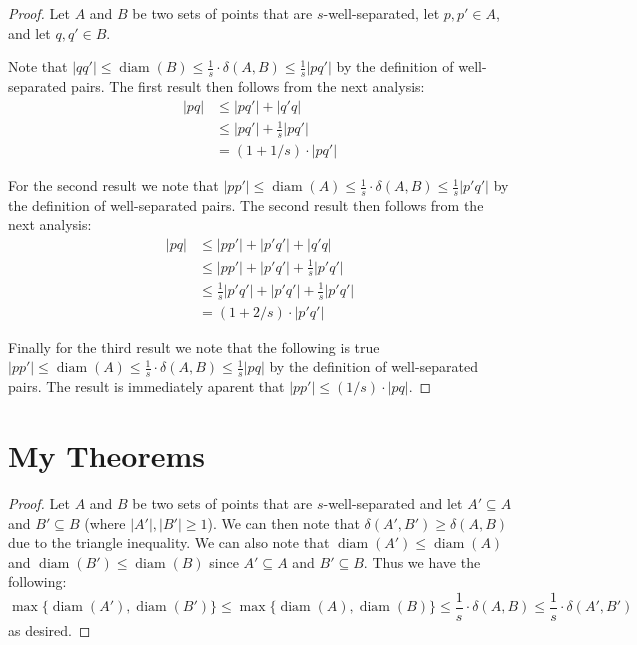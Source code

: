 \documentclass{article}
\newtheorem{lem}[thm]{Lemma}
\theoremstyle{definition}
\newcommand{\dist}{\delta}
\DeclareMathOperator{\diam}{diam}
\begin{document}
\begin{proof}
    Let $A$ and $B$ be two sets of points that are $s$-well-separated, let $p,p' \in A$, and let $q,q' \in B$.

    Note that $|qq'| \leq \diam(B) \leq \frac{1}{s} \cdot \dist(A,B) \leq \frac{1}{s} |pq'|$ by the definition of well-separated pairs.
    The first result then follows from the next analysis:
    \begin{align*}
        |pq| &\leq |pq'| + |q'q| \\
        &\leq |pq'| + \frac{1}{s} |pq'| \\
        &= (1 + 1/s) \cdot |pq'|
    \end{align*}

    For the second result we note that $|pp'| \leq \diam(A) \leq \frac{1}{s} \cdot \dist(A,B) \leq \frac{1}{s} |p'q'|$ by the definition of well-separated pairs.
    The second result then follows from the next analysis:
    \begin{align*}
        |pq| &\leq |pp'| + |p'q'| + |q'q| \\
        &\leq |pp'| + |p'q'| + \frac{1}{s} |p'q'| \\
        &\leq \frac{1}{s} |p'q'| + |p'q'| + \frac{1}{s} |p'q'| \\
        &= (1 + 2/s) \cdot |p'q'|
    \end{align*}
    
    Finally for the third result we note that the following is true $|pp'| \leq \diam(A) \leq \frac{1}{s} \cdot \dist(A,B) \leq \frac{1}{s} |pq|$ by the definition of well-separated pairs. The result is immediately aparent that $|pp'| \leq (1/s) \cdot |pq|$.
\end{proof}

\section{My Theorems}

\begin{proof}
    Let $A$ and $B$ be two sets of points that are $s$-well-separated and let $A' \subseteq A$ and $B' \subseteq B$ (where $|A'|, |B'| \geq 1$).
    We can then note that $\dist(A', B') \geq \dist(A,B)$ due to the triangle inequality.
    We can also note that $\diam(A') \leq \diam(A)$ and $\diam(B') \leq \diam(B)$ since $A' \subseteq A$ and $B' \subseteq B$.
    Thus we have the following:
    $$\max\{\diam(A'), \diam(B')\} \leq \max\{\diam(A), \diam(B)\} \leq \frac{1}{s} \cdot \dist(A,B) \leq \frac{1}{s} \cdot \dist(A', B')$$
    as desired.
\end{proof}
\end{document}
